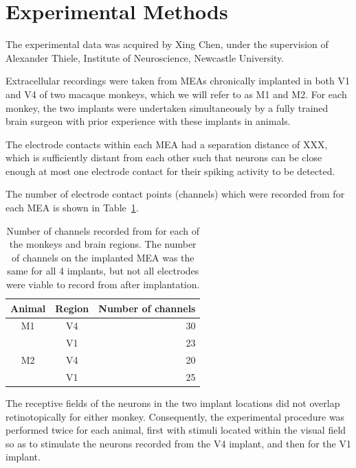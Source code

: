 \section{Experimental Methods}
\label{ch:exp}

The experimental data was acquired by Xing Chen, under the supervision of Alexander Thiele, Institute of Neuroscience, Newcastle University.

Extracellular recordings were taken from \acp{MEA} chronically implanted in both \ac{V1} and \ac{V4} of two macaque monkeys, which we will refer to as \ac{M1} and \ac{M2}.
For each monkey, the two implants were undertaken simultaneously by a fully trained brain surgeon with prior experience with these implants in animals.

The electrode contacts within each \ac{MEA} had a separation distance of XXX,%
which is sufficiently distant from each other such that neurons can be close enough at most one electrode contact for their spiking activity to be detected.%

The number of electrode contact points (channels) which were recorded from for each \ac{MEA} is shown in Table~\ref{tab:nchannels}.

\begin{table}[hbtp]
\caption{Number of channels recorded from for each of the monkeys and brain regions.
The number of channels on the implanted \ac{MEA} was the same for all 4 implants, but not all electrodes were viable to record from after implantation.}
\label{tab:nchannels}
\begin{center}
\begin{tabular}{ccr}
\toprule
Animal  & Region    & Number of channels \\
\midrule
M1      & V4        & 30 \\
        & V1        & 23 \\
M2      & V4        & 20 \\
        & V1        & 25 \\
\bottomrule
\end{tabular}
\end{center}
\end{table}

The receptive fields of the neurons in the two implant locations did not overlap retinotopically for either monkey.
Consequently, the experimental procedure was performed twice for each animal, first with stimuli located within the visual field so as to stimulate the neurons recorded from the \ac{V4} implant, and then for the \ac{V1} implant.


